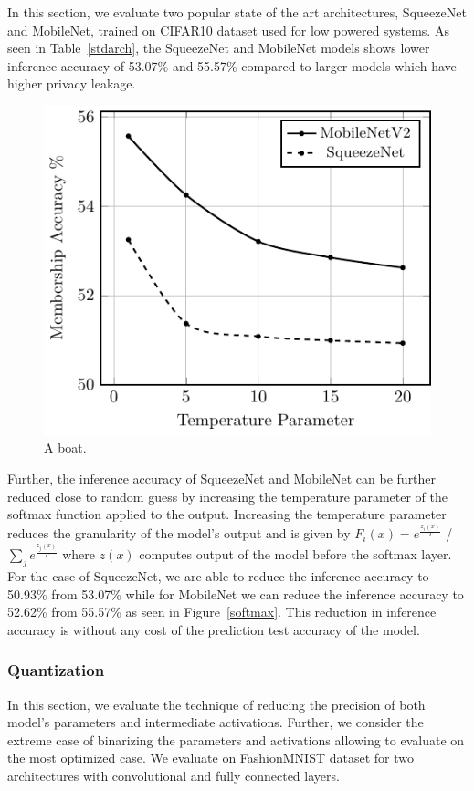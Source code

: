 In this section, we evaluate two popular state of the art architectures, SqueezeNet and MobileNet, trained on CIFAR10 dataset used for low powered systems.
As seen in Table~\ref{stdarch}, the SqueezeNet and MobileNet models shows lower inference accuracy of 53.07\% and 55.57\% compared to larger models which have higher privacy leakage.


\begin{figure}
  \includegraphics[width=0.6\columnwidth]{figures/efficientArch.pdf}
  \caption{A boat.}
  \label{fig:wtsharing}
\end{figure}

Further, the inference accuracy of SqueezeNet and MobileNet can be further reduced close to random guess by increasing the temperature parameter of the softmax function applied to the output.
Increasing the temperature parameter reduces the granularity of the model's output and is given by
$F_i(x) = e^{\frac{z_i(x)}{T}}$ / $ \sum_{j}e^{\frac{z_j(x)}{T}}$
where $z(x)$ computes output of the model before the softmax layer.
For the case of SqueezeNet, we are able to reduce the inference accuracy to 50.93\% from 53.07\% while for MobileNet we can reduce the inference accuracy to 52.62\% from 55.57\% as seen in Figure~\ref{softmax}.
This reduction in inference accuracy is without any cost of the prediction test accuracy of the model.




\subsubsection{Quantization}\label{quant}

In this section, we evaluate the technique of reducing the precision of both model's parameters and intermediate activations.
Further, we consider the extreme case of binarizing the parameters and activations allowing to evaluate on the most optimized case.
We evaluate on FashionMNIST dataset for two architectures with convolutional and fully connected layers.

